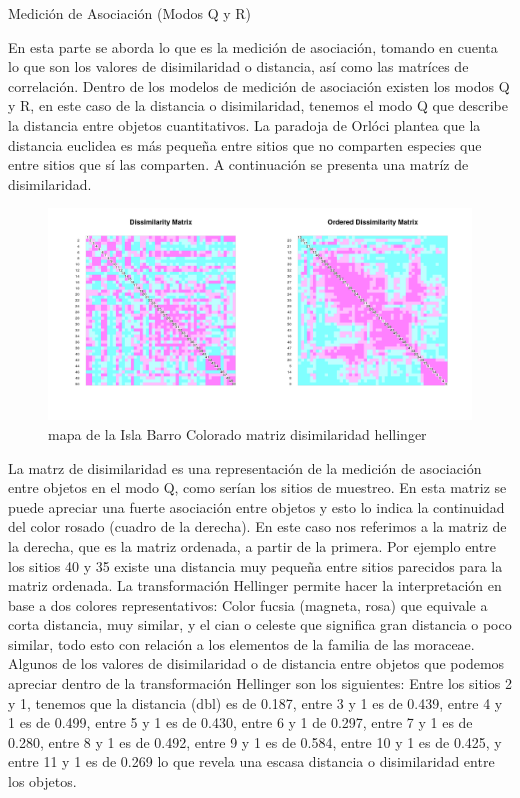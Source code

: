 \documentclass[11pt,]{article}
\begin{document}
Medición de Asociación (Modos Q y R)

En esta parte se aborda lo que es la medición de asociación, tomando en
cuenta lo que son los valores de disimilaridad o distancia, así como las
matríces de correlación. Dentro de los modelos de medición de asociación
existen los modos Q y R, en este caso de la distancia o disimilaridad,
tenemos el modo Q que describe la distancia entre objetos cuantitativos.
La paradoja de Orlóci plantea que la distancia euclidea es más pequeña
entre sitios que no comparten especies que entre sitios que sí las
comparten. A continuación se presenta una matríz de disimilaridad.

\begin{figure}
\centering
\includegraphics[width=1.00000\textwidth]{matriz_disimilaridad_hellinger.png}
\caption{mapa de la Isla Barro Colorado matriz disimilaridad hellinger
\label{fig:bci_map}}
\end{figure}

La matrz de disimilaridad es una representación de la medición de
asociación entre objetos en el modo Q, como serían los sitios de
muestreo. En esta matriz se puede apreciar una fuerte asociación entre
objetos y esto lo indica la continuidad del color rosado (cuadro de la
derecha). En este caso nos referimos a la matriz de la derecha, que es
la matriz ordenada, a partir de la primera. Por ejemplo entre los sitios
40 y 35 existe una distancia muy pequeña entre sitios parecidos para la
matriz ordenada. La transformación Hellinger permite hacer la
interpretación en base a dos colores representativos: Color fucsia
(magneta, rosa) que equivale a corta distancia, muy similar, y el cian o
celeste que significa gran distancia o poco similar, todo esto con
relación a los elementos de la familia de las moraceae. Algunos de los
valores de disimilaridad o de distancia entre objetos que podemos
apreciar dentro de la transformación Hellinger son los siguientes: Entre
los sitios 2 y 1, tenemos que la distancia (dbl) es de 0.187, entre 3 y
1 es de 0.439, entre 4 y 1 es de 0.499, entre 5 y 1 es de 0.430, entre 6
y 1 de 0.297, entre 7 y 1 es de 0.280, entre 8 y 1 es de 0.492, entre 9
y 1 es de 0.584, entre 10 y 1 es de 0.425, y entre 11 y 1 es de 0.269 lo
que revela una escasa distancia o disimilaridad entre los objetos.
\end{document}
